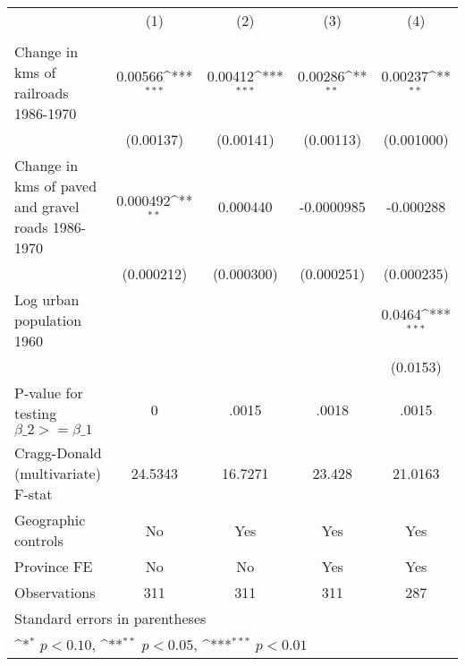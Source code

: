 {
\def\sym#1{\ifmmode^{#1}\else\(^{#1}\)\fi}
\begin{tabular}{l*{4}{c}}
\hline\hline
                &\multicolumn{1}{c}{(1)}&\multicolumn{1}{c}{(2)}&\multicolumn{1}{c}{(3)}&\multicolumn{1}{c}{(4)}\\
                &\multicolumn{1}{c}{}&\multicolumn{1}{c}{}&\multicolumn{1}{c}{}&\multicolumn{1}{c}{}\\
\hline
Change in kms of railroads 1986-1970&  0.00566\sym{***}&  0.00412\sym{***}&  0.00286\sym{**} &  0.00237\sym{**} \\
                &(0.00137)         &(0.00141)         &(0.00113)         &(0.001000)         \\
[1em]
Change in kms of paved and gravel roads 1986-1970& 0.000492\sym{**} & 0.000440         &-0.0000985         &-0.000288         \\
                &(0.000212)         &(0.000300)         &(0.000251)         &(0.000235)         \\
[1em]
Log urban population 1960&                  &                  &                  &   0.0464\sym{***}\\
                &                  &                  &                  & (0.0153)         \\
\hline
P-value for testing $\beta\_{2} >= \beta\_{1}$&        0         &    .0015         &    .0018         &    .0015         \\
Cragg-Donald (multivariate) F-stat&  24.5343         &  16.7271         &   23.428         &  21.0163         \\
Geographic controls&       No         &      Yes         &      Yes         &      Yes         \\
Province FE     &       No         &       No         &      Yes         &      Yes         \\
Observations    &      311         &      311         &      311         &      287         \\
\hline\hline
\multicolumn{5}{l}{\footnotesize Standard errors in parentheses}\\
\multicolumn{5}{l}{\footnotesize \sym{*} \(p<0.10\), \sym{**} \(p<0.05\), \sym{***} \(p<0.01\)}\\
\end{tabular}
}

